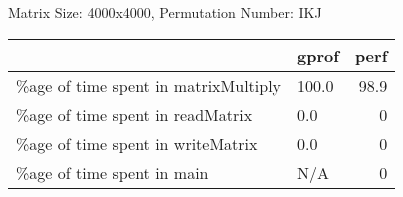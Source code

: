 \documentclass{article}
\begin{document}
    Matrix Size: 4000x4000, Permutation Number: IKJ \\
    \begin{tabular}{llr}
\hline
                                      & gprof   &   perf \\
\hline
 \%age of time spent in matrixMultiply & 100.0   &   98.9 \\
 \%age of time spent in readMatrix     & 0.0     &    0   \\
 \%age of time spent in writeMatrix    & 0.0     &    0   \\
 \%age of time spent in main           & N/A     &    0   \\
\hline
\end{tabular}
    
\end{document}

